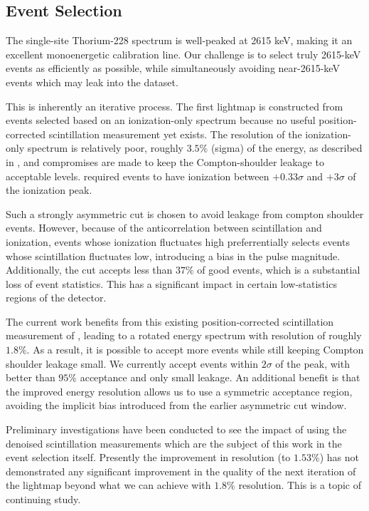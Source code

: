 \subsection{Event Selection}\label{sec:LightmapEventSelection}

The single-site Thorium-228 spectrum is well-peaked at 2615 keV, making it an excellent monoenergetic calibration line.  Our challenge is to select truly 2615-keV events as efficiently as possible, while simultaneously avoiding near-2615-keV events which may leak into the dataset.

This is inherently an iterative process.  The first lightmap is constructed from events selected based on an ionization-only spectrum because no useful position-corrected scintillation measurement yet exists. The resolution of the ionization-only spectrum is relatively poor, roughly $3.5\%$ (sigma) of the energy, as described in \cite{ThesisSteve}, and compromises are made to keep the Compton-shoulder leakage to acceptable levels.  \cite{ThesisSteve} required events to have ionization between $+0.33\sigma$ and $+3\sigma$ of the ionization peak.

Such a strongly asymmetric cut is chosen to avoid leakage from compton shoulder events.  However, because of the anticorrelation between scintillation and ionization, events whose ionization fluctuates high preferrentially selects events whose scintillation fluctuates low, introducing a bias in the pulse magnitude.  Additionally, the cut accepts less than $37\%$ of good events, which is a substantial loss of event statistics. This has a significant impact in certain low-statistics regions of the detector.

The current work benefits from this existing position-corrected scintillation measurement of \cite{ThesisSteve}, leading to a rotated energy spectrum with resolution of roughly $1.8\%$.  As a result, it is possible to accept more events while still keeping Compton shoulder leakage small.  We currently accept events within $2\sigma$ of the peak, with better than $95\%$ acceptance and only small leakage.  An additional benefit is that the improved energy resolution allows us to use a symmetric acceptance region, avoiding the implicit bias introduced from the earlier asymmetric cut window.

Preliminary investigations have been conducted to see the impact of using the denoised scintillation measurements which are the subject of this work in the event selection itself.  Presently the improvement in resolution (to $1.53\%$) has not demonstrated any significant improvement in the quality of the next iteration of the lightmap beyond what we can achieve with $1.8\%$ resolution. This is a topic of continuing study.

